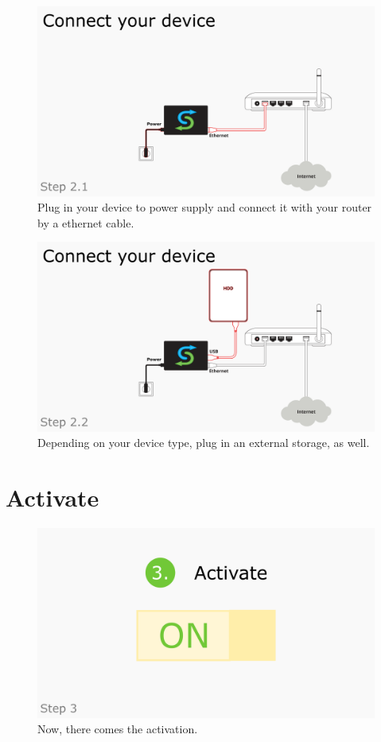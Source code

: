 \documentclass[a4paper,12pt]{article}
\begin{document}
\begin{figure}[htbp!]
	\centering
	\includegraphics[width=0.7\linewidth]{../frames/23.png}
	\caption{Plug in your device to power supply and connect it with your router by a ethernet cable.}
	\label{fig:12}
\end{figure}

\begin{figure}[htbp!]
	\centering
	\includegraphics[width=0.7\linewidth]{../frames/24.png}
	\caption{Depending on your device type, plug in an external storage, as well.}
	\label{fig:13}
\end{figure}

\section{Activate}

\begin{figure}[htbp!]
	\centering
	\includegraphics[width=0.7\linewidth]{../frames/26.png}
	\caption{Now, there comes the activation.}
	\label{fig:14}
\end{figure}
\end{document}
